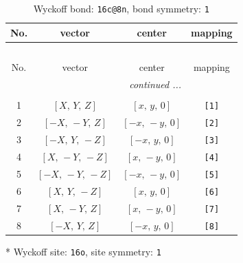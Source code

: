 \documentclass[fleqn,8pt]{jsarticle}
\begin{document}
\renewcommand{\arraystretch}{1.2}
\begin{longtable}{cccc}
\caption{Wyckoff bond: {\tt 16c@8n}, bond symmetry: {\tt 1}}
 \\
 \hline \hline
No. & vector & center & mapping \\ \hline \endfirsthead

\multicolumn{3}{l}{\tablename\ \thetable{}} \\
 \hline \hline
No. & vector & center & mapping \\ \hline \endhead

 \hline \hline
\multicolumn{3}{r}{\footnotesize\it continued ...} \\ \endfoot

 \hline \hline
\multicolumn{3}{r}{} \\ \endlastfoot

1 & $\left[ X,\, Y,\, Z \right]$ & $\left[ x,\, y,\, 0 \right]$ & {\tt [1]} \\ \hline
2 & $\left[ - X,\, - Y,\, Z \right]$ & $\left[ - x,\, - y,\, 0 \right]$ & {\tt [2]} \\ \hline
3 & $\left[ - X,\, Y,\, - Z \right]$ & $\left[ - x,\, y,\, 0 \right]$ & {\tt [3]} \\ \hline
4 & $\left[ X,\, - Y,\, - Z \right]$ & $\left[ x,\, - y,\, 0 \right]$ & {\tt [4]} \\ \hline
5 & $\left[ - X,\, - Y,\, - Z \right]$ & $\left[ - x,\, - y,\, 0 \right]$ & {\tt [5]} \\ \hline
6 & $\left[ X,\, Y,\, - Z \right]$ & $\left[ x,\, y,\, 0 \right]$ & {\tt [6]} \\ \hline
7 & $\left[ X,\, - Y,\, Z \right]$ & $\left[ x,\, - y,\, 0 \right]$ & {\tt [7]} \\ \hline
8 & $\left[ - X,\, Y,\, Z \right]$ & $\left[ - x,\, y,\, 0 \right]$ & {\tt [8]} \\
\end{longtable}
* Wyckoff site: {\tt 16o}, site symmetry: {\tt 1}
\renewcommand{\arraystretch}{1.2}
\end{document}
